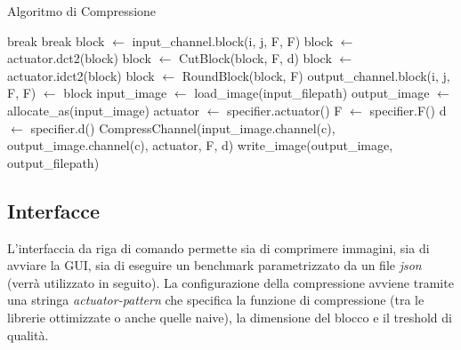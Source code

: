 \documentclass[a4paper,11pt,oneside, table]{article}
\begin{document}
\begin{algorithm}
  \renewcommand\thealgorithm{}
  \caption{Algoritmo di Compressione}
  \begin{algorithmic}
          \State break
        \EndIf
            \State break
          \EndIf
          \State block $\gets$ input\_channel.block(i, j, F, F)
          \State block $\gets$ actuator.dct2(block)
          \State block $\gets$ CutBlock(block, F, d)
          \State block $\gets$ actuator.idct2(block)
          \State block $\gets$ RoundBlock(block, F)
          \State output\_channel.block(i, j, F, F) $\gets$ block
        \EndFor
      \EndFor
    \EndProcedure
      \State input\_image $\gets$ load\_image(input\_filepath)
      \State output\_image $\gets$ allocate\_as(input\_image)
      \State actuator $\gets$ specifier.actuator()
      \State F $\gets$ specifier.F()
      \State d $\gets$ specifier.d()
        \State CompressChannel(input\_image.channel(c), output\_image.channel(c), actuator, F, d)
      \EndFor
      \State write\_image(output\_image, output\_filepath)
    \EndProcedure
  \end{algorithmic}
\end{algorithm}

\pagebreak

\subsection{Interfacce}

L'interfaccia da riga di comando permette sia di comprimere immagini, sia di avviare la GUI, sia di eseguire un benchmark parametrizzato da un file \textit{json} (verr\`a utilizzato in seguito).
La configurazione della compressione avviene tramite una stringa \textit{actuator-pattern} che specifica la funzione di compressione (tra le librerie ottimizzate o anche quelle naive), la dimensione del blocco e il treshold di qualit\`a.
\end{document}

